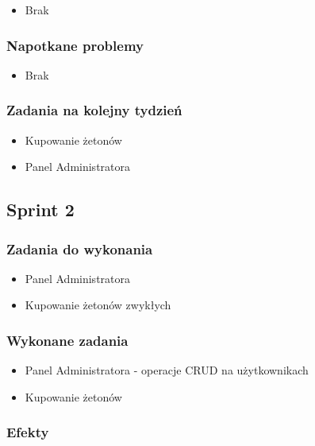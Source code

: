 \begin{itemize}
\item Brak
\end{itemize}

\subsubsection{Napotkane problemy}

\begin{itemize}
\item Brak
\end{itemize}

\subsubsection{Zadania na kolejny tydzień}
\begin{itemize}
    \item Kupowanie żetonów
    \item Panel Administratora
\end{itemize}

\subsection{Sprint 2}


\subsubsection{Zadania do wykonania}

\begin{itemize}
	\item Panel Administratora
	\item Kupowanie żetonów zwykłych
\end{itemize}

\subsubsection{Wykonane zadania}
\begin{itemize}
	\item Panel Administratora - operacje CRUD na użytkownikach
	\item Kupowanie żetonów
\end{itemize}

\subsubsection{Efekty}

